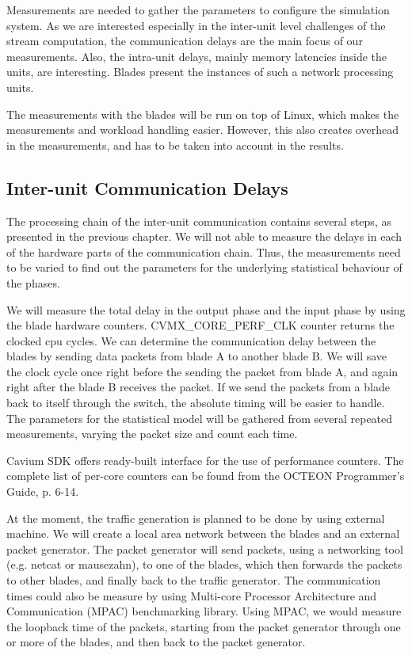 Measurements are needed to gather the parameters to configure the simulation system. As we are interested especially in the inter-unit level challenges of the stream computation, the communication delays are the main focus of our measurements. Also, the intra-unit delays, mainly memory latencies inside the units, are interesting. Blades present the instances of such a network processing units.

The measurements with the blades will be run on top of Linux, which makes the measurements and workload handling easier. However, this also creates overhead in the measurements, and has to be taken into account in the results.

\subsection{Inter-unit Communication Delays}
The processing chain of the inter-unit communication contains several steps, as presented in the previous chapter. We will not able to measure the delays in each of the hardware parts of the communication chain. Thus, the measurements need to be varied to find out the parameters for the underlying statistical behaviour of the phases.

We will measure the total delay in the output phase and the input phase by using the blade hardware counters. CVMX\_CORE\_PERF\_CLK counter returns the clocked cpu cycles. We can determine the communication delay between the blades by sending data packets from blade A to another blade B. We will save the clock cycle once right before the sending the packet from blade A, and again right after the blade B receives the packet. If we send the packets from a blade back to itself through the switch, the absolute timing will be easier to handle. The parameters for the statistical model will be gathered from several repeated measurements, varying the packet size and count each time.

Cavium SDK offers ready-built interface for the use of performance counters. The complete list of per-core counters can be found from the OCTEON Programmer's Guide, p. 6-14.

At the moment, the traffic generation is planned to be done by using external machine. We will create a local area network between the blades and an external packet generator. The packet generator will send packets, using a networking tool (e.g. netcat or mausezahn), to one of the blades, which then forwards the packets to other blades, and finally back to the traffic generator. The communication times could also be measure by using Multi-core Processor Architecture and Communication (MPAC) benchmarking library. Using MPAC, we would measure the loopback time of the packets, starting from the packet generator through one or more of the blades, and then back to the packet generator.

